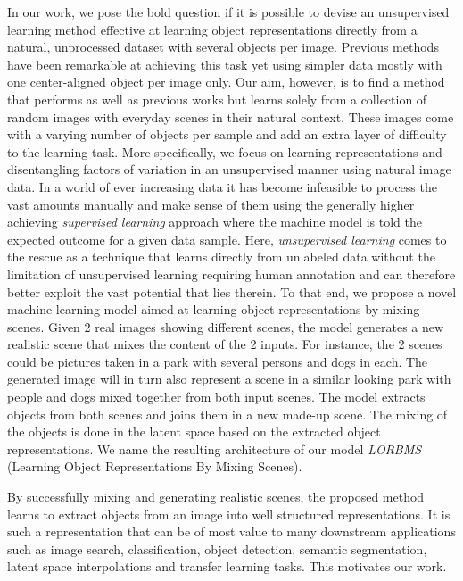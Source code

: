 \documentclass[12pt,a4paper]{article}
\begin{document}
In our work, we pose the bold question if it is possible to devise an unsupervised learning method effective at learning object representations directly from a natural, unprocessed dataset with several objects per image. Previous methods have been remarkable at achieving this task yet using simpler data mostly with one center-aligned object per image only. Our aim, however, is to find a method that performs as well as previous works but learns solely from a collection of random images with everyday scenes in their natural context. These images come with a varying number of objects per sample and add an extra layer of difficulty to the learning task. More specifically, we focus on learning representations and disentangling factors of variation in an unsupervised manner using natural image data. In a world of ever increasing data it has become infeasible to process the vast amounts manually and make sense of them using the generally higher achieving \textit{supervised learning} approach where the machine model is told the expected outcome for a given data sample. Here, \textit{unsupervised learning} comes to the rescue as a technique that learns directly from unlabeled data without the limitation of unsupervised learning requiring human annotation and can therefore better exploit the vast potential that lies therein. To that end, we propose a novel machine learning model aimed at learning object representations by mixing scenes. Given 2 real images showing different scenes, the model generates a new realistic scene that mixes the content of the 2 inputs. For instance, the 2 scenes could be pictures taken in a park with several persons and dogs in each. The generated image will in turn also represent a scene in a similar looking park with people and dogs mixed together from both input scenes. The model extracts objects from both scenes and joins them in a new made-up scene. The mixing of the objects is done in the latent space based on the extracted object representations. We name the resulting architecture of our model \textit{LORBMS} (Learning Object Representations By Mixing Scenes).

By successfully mixing and generating realistic scenes, the proposed method learns to extract objects from an image into well structured representations. It is such a representation that can be of most value to many downstream applications such as image search, classification, object detection, semantic segmentation, latent space interpolations and transfer learning tasks. This motivates our work.
\end{document}
